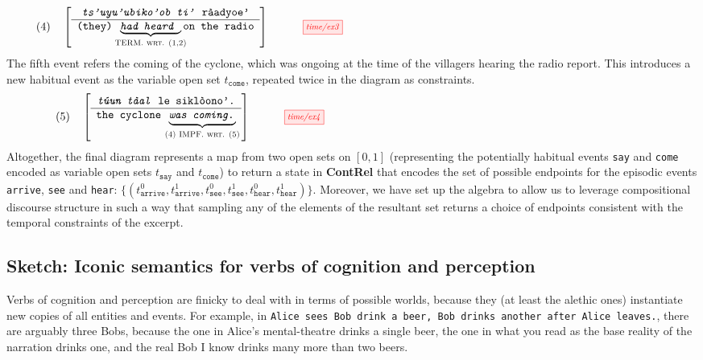 \begin{example}
\[(4) \quad \left[ \begin{array}{c} \texttt{\emph{ts'uyu'ubiko'ob ti'} r\`{a}adyoe'} \\ \hline \texttt{(they) }\underbrace{\texttt{\emph{had heard }}}_{\textsc{\makebox[0pt]{TERM. wrt. (1,2)}}}\texttt{on the radio} \end{array} \right] \quad \vcenter{\scalebox{0.75}{\tikzfig{time/ex3}}}\]
The fifth event refers the coming of the cyclone, which was ongoing at the time of the villagers hearing the radio report. This introduces a new habitual event as the variable open set $t_\texttt{come}$, repeated twice in the diagram as constraints.
\[(5) \quad \left[ \begin{array}{c} \texttt{\emph{t\'{u}un t\`{a}al} le sikl\`{o}ono'.} \\ \hline \texttt{the cyclone }\underbrace{\texttt{\emph{was coming.}}}_{\textsc{\makebox[0pt]{(4) IMPF. wrt. (5)}}} \end{array} \right] \quad \vcenter{\scalebox{0.75}{\tikzfig{time/ex4}}}\]
Altogether, the final diagram represents a map from two open sets on $[0,1]$ (representing the potentially habitual events \texttt{say} and \texttt{come} encoded as variable open sets $t_\texttt{say}$ and $t_\texttt{come}$) to return a state in \textbf{ContRel} that encodes the set of possible endpoints for the episodic events \texttt{arrive}, \texttt{see} and \texttt{hear}: $\{(t_\texttt{arrive}^0,t_\texttt{arrive}^1,t_\texttt{see}^0,t_\texttt{see}^1,t_\texttt{hear}^0,t_\texttt{hear}^1)\}$. Moreover, we have set up the algebra to allow us to leverage compositional discourse structure in such a way that sampling any of the elements of the resultant set returns a choice of endpoints consistent with the temporal constraints of the excerpt.
\end{example}

\subsection{Sketch: Iconic semantics for verbs of cognition and perception}

Verbs of cognition and perception are finicky to deal with in terms of possible worlds, because they (at least the alethic ones) instantiate new copies of all entities and events. For example, in \texttt{Alice sees Bob drink a beer, Bob drinks another after Alice leaves.}, there are arguably three Bobs, because the one in Alice's mental-theatre drinks a single beer, the one in what you read as the base reality of the narration drinks one, and the real Bob I know drinks many more than two beers. 